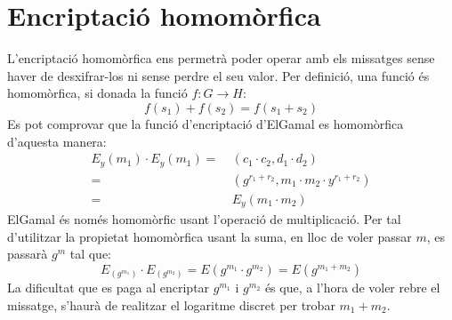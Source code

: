 \documentclass{article}
\begin{document}
\section{Encriptació homomòrfica}\label{sec:homomorfism}
L'encriptació homomòrfica ens permetrà poder operar amb els missatges sense haver de desxifrar-los ni sense perdre el seu valor.
Per definició, una funció és homomòrfica, si donada la funció $f: G \rightarrow H$:
\[f(s_1) + f(s_2) = f(s_1+s_2)\]
Es pot comprovar que la funció d'encriptació d'ElGamal es homomòrfica d'aquesta manera:
\begin{equation*}
\begin{aligned}
	E_y(m_1) \cdot E_y(m_1) =& \ (c_1 \cdot c_2, d_1 \cdot d_2)\\
	=& \ (g^{r_1 + r_2}, m_1 \cdot m_2 \cdot y^{r_1 + r_2} ) \\
	=& \ E_y(m_1 \cdot m_2)
\end{aligned}
\end{equation*}
ElGamal és només homomòrfic usant l'operació de multiplicació. Per tal d'utilitzar la propietat homomòrfica usant la suma, en lloc de voler passar $m$, es passarà $g^m$ tal que:
\[E_(g^{m_1})  \cdot E_(g^{m_2}) = E(g^{m_1} \cdot g^{m_2}) = E(g^{m_1 + m_2})\] 
La dificultat que es paga al encriptar $g^{m_1}$ i $g^{m_2}$ és que, a l'hora de voler rebre el missatge, s'haurà de realitzar el logaritme discret per trobar $m_1 + m _2$.
\end{document}
